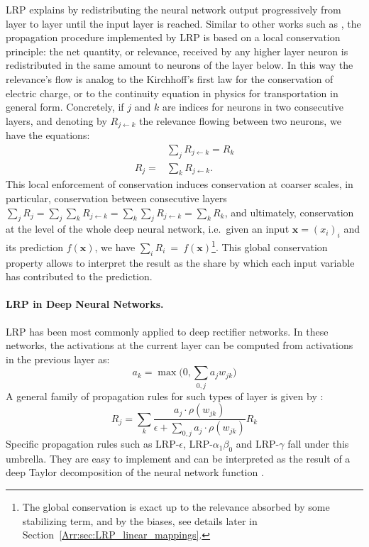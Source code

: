 \documentclass[runningheads]{llncs}
\newcommand\Bx{\bm{x}}%
\begin{document}
LRP explains by redistributing the neural network output progressively from layer to layer until the input layer is reached. Similar to other works such as \cite{Arr:Landecker:13,Arr:Zhang:16,Arr:Shrikumar:PMLR2017}, the propagation procedure implemented by LRP is based on a local conservation principle: the net quantity, or relevance, received by any higher layer neuron is redistributed in the same amount to neurons of the layer below. 
In this way the relevance's flow is analog to the Kirchhoff’s first law for the conservation of electric charge, or to the continuity equation in physics for transportation in general form.
Concretely, if $j$ and $k$ are indices for neurons in two consecutive layers, and denoting by $R_{j \leftarrow k}$ the relevance flowing between two neurons, we have the equations:
\begin{align*}
&\textstyle \sum_j R_{j \leftarrow k} = R_k\\
R_j = &\textstyle \sum_k R_{j \leftarrow k}.
\end{align*}
This local enforcement of conservation induces conservation at coarser scales, in particular, conservation between consecutive layers $
\textstyle \sum_j R_j = \sum_j \sum_k R_{j \leftarrow k} = \sum_k \sum_j R_{j \leftarrow k} = \sum_k R_k$, and ultimately, conservation at the level of the whole deep neural network, i.e.\ given an input $\Bx = (x_i)_i$ and its prediction $f(\Bx)$, we have $\sum_i R_i \ = \ f(\Bx)$\footnote{The global conservation is exact up to the relevance absorbed by some stabilizing term, and by the biases, see details later in Section~\ref{Arr:sec:LRP_linear_mappings}.}. This global conservation property allows to interpret the result as the share by which each input variable has contributed to the prediction.

\paragraph{LRP in Deep Neural Networks.}

LRP has been most commonly applied to deep rectifier networks. In these networks, the activations at the current layer can be computed from activations in the previous layer as:
$$
\textstyle a_k = \max\big(0,\sum_{0,j} a_j w_{jk}\big)
$$
A general family of propagation rules for such types of layer is given by \cite{Arr:montavon2019overview}:
$$
R_j = \sum_k \frac{a_j \cdot \rho(w_{jk})}{\epsilon + \sum_{0,j} a_j \cdot \rho(w_{jk})} R_k
$$
Specific propagation rules such as LRP-$\epsilon$, LRP-$\alpha_1\beta_0$  and LRP-$\gamma$ fall under this umbrella. They are easy to implement \cite{Arr:Lapuschkin2016LRPtoolbox,Arr:montavon2019overview} and can be interpreted as the result of a deep Taylor decomposition of the neural network function \cite{Arr:Montavon:PR2017}.
\end{document}
